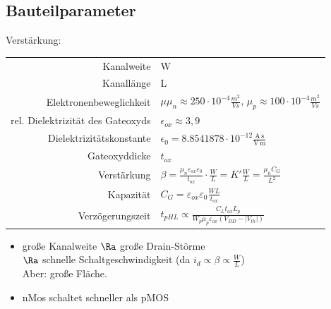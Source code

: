 \documentclass[6pt,a4paper]{scrartcl}
\begin{document}
\begin{multicols}{3}
{		\subsection{Bauteilparameter}
	Verstärkung:  \\
	\begin{tabular} {r | l}
		Kanalweite & W  \\
		Kanallänge & L  \\
		Elektronenbeweglichkeit & $\mu$\quad $\mu_n \approx 250 \cdot 10^{-4} \frac{m^2}{Vs}$, $\mu_p \approx 100 \cdot 10^{-4} \frac{m^2}{Vs}$ \\
		rel. Dielektrizität des Gateoxyds & $\epsilon_{ox} \approx 3,9$ \\
		Dielektrizitätskonstante & $\epsilon_0 = 8.8541878 \cdot 10^{-12} \frac{\mathrm{A\,s}}{\mathrm{V\,m}}$ \\
		Gateoxyddicke & $t_{ox}$ \\
		Verstärkung & $\beta = \frac{\mu_n \varepsilon_{ox} \varepsilon_0}{t_{ox}} \cdot \frac{W}{L} = K' \frac{W}{L} = \frac{\mu_n C_G}{L^2}$ \\
		Kapazität & $C_G = \varepsilon_{ox} \varepsilon_0 \frac{WL}{t_{ox}}$ \\
		Verzögerungszeit & $t_{pHL} \propto \frac{C_L t_{ox} L_p}{W_p \mu_p \varepsilon_{ox} (V_{DD} - |V_{th}|)}$ \\
	\end{tabular}
	\begin{itemize}
		\item große Kanalweite $\Ra$ große Drain-Störme \\ $\Ra$ schnelle Schaltgeschwindigkeit (da $i_d \propto \beta \propto \frac{W}{L}$) \\
		Aber: große Fläche.
		\item nMos schaltet schneller als pMOS 
	\end{itemize}
	}
	
	
\sectionbox{
}
\end{multicols}
\end{document}
